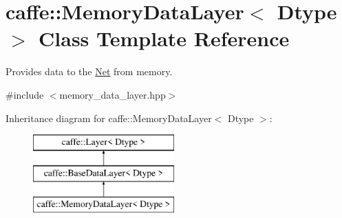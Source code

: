 \hypertarget{classcaffe_1_1MemoryDataLayer}{}\section{caffe\+:\+:Memory\+Data\+Layer$<$ Dtype $>$ Class Template Reference}
\label{classcaffe_1_1MemoryDataLayer}


Provides data to the \hyperlink{classcaffe_1_1Net}{Net} from memory.  




{\ttfamily \#include $<$memory\+\_\+data\+\_\+layer.\+hpp$>$}

Inheritance diagram for caffe\+:\+:Memory\+Data\+Layer$<$ Dtype $>$\+:\begin{figure}[H]
\begin{center}
\leavevmode
\includegraphics[height=3.000000cm]{classcaffe_1_1MemoryDataLayer}
\end{center}
\end{figure}
